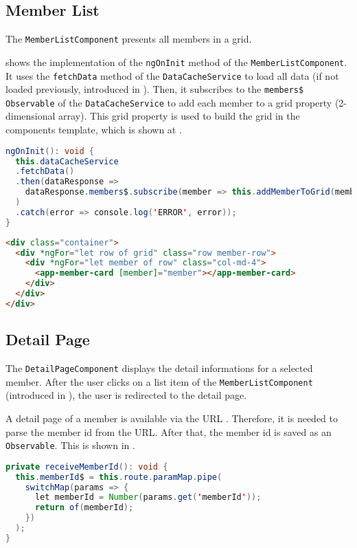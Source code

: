 \newpage
\subsection{Member List}\label{subsec:02_impl_memberlist}
The \texttt{MemberListComponent} presents all members in a grid.


 shows the implementation of the \texttt{ngOnInit} method of the \newline \texttt{MemberListComponent}. It uses the \texttt{fetchData} method of the \texttt{DataCacheService} to load all data (if not loaded previously, introduced in ). Then, it subscribes to the \texttt{members\$} \texttt{Observable} of the \texttt{DataCacheService} to add each member to a grid property (2-dimensional array).
This grid property is used to build the grid in the components template, which is shown at .

\begin{lstlisting}[label=lst:02_impl_memberlist_ngoninit, caption=\texttt{MemberListComponent} \texttt{ngOnInit} implementation, language=java]
ngOnInit(): void {
  this.dataCacheService
  .fetchData()
  .then(dataResponse =>
    dataResponse.members$.subscribe(member => this.addMemberToGrid(member))
  )
  .catch(error => console.log('ERROR', error));
}
\end{lstlisting}


\begin{lstlisting}[label=lst:02_impl_memberlist_template, caption=Template of \texttt{MemberListComponent}, language=HTML]
<div class="container">
  <div *ngFor="let row of grid" class="row member-row">
    <div *ngFor="let member of row" class="col-md-4">
      <app-member-card [member]="member"></app-member-card>
    </div>
  </div>
</div>
\end{lstlisting}


\newpage
\subsection{Detail Page}\label{subsec:02_impl_detail}
The \texttt{DetailPageComponent} displays the detail informations for a selected member.
After the user clicks on a list item of the \texttt{MemberListComponent} (introduced in ), the user is redirected to the detail page.


A detail page of a member is available via the URL . Therefore, it is needed to parse the member id from the URL. After that, the member id is saved as an \texttt{Observable}. This is shown in .
\begin{lstlisting}[label=lst:02_impl_detail_receiveMemberId, caption=Implementation of \texttt{receiveMemberId}, language=java]
private receiveMemberId(): void {
  this.memberId$ = this.route.paramMap.pipe(
    switchMap(params => {
      let memberId = Number(params.get('memberId'));
      return of(memberId);
    })
  );
}
\end{lstlisting}

